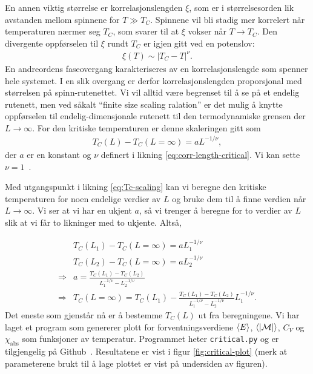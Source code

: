 \documentclass[11pt]{article}
\newcommand{\abs}[1]{|#1|}
\begin{document}
En annen viktig størrelse er korrelasjonslengden $\xi$, som er i
størrelsesorden lik avstanden mellom spinnene for $T\gg T_C$. Spinnene
vil bli stadig mer korrelert når temperaturen nærmer seg $T_C$, som
svarer til at $\xi$ vokser når $T\rightarrow T_C$. Den divergente
oppførselen til $\xi$ rundt $T_C$ er igjen gitt ved en potenslov:
\begin{align}
  \xi(T) \sim |T_C - T|^\nu.\label{eq:corr-length-critical}
\end{align}
En andreordens faseovergang karakteriseres av en korrelasjonslengde
som spenner hele systemet. I en slik overgang er derfor
korrelasjonslengden proporsjonal med størrelsen på
spinn-rutenettet. Vi vil alltid være begrenset til å se på et endelig
rutenett, men ved såkalt ``finite size scaling ralation'' er det mulig
å knytte oppførselen til endelig-dimensjonale rutenett til den
termodynamiske grensen der $L\rightarrow\infty$. For den kritiske
temperaturen er denne skaleringen gitt som 
\begin{align}
  T_C(L) - T_C(L=\infty) = aL^{-1/\nu}\label{eq:Tc-scaling},
\end{align} 
der $a$ er en konstant og $\nu$ definert i likning \eqref{eq:corr-length-critical}.  Vi kan sette
$\nu=1$~\cite{oppgavetekst-prosjekt-4}. 

\vspace{\baselineskip}

Med utgangspunkt i likning \eqref{eq:Tc-scaling} kan vi beregne den
kritiske temperaturen for noen endelige verdier av $L$ og bruke dem
til å finne verdien når $L\rightarrow\infty$. Vi ser at vi har en
ukjent $a$, så vi trenger å beregne for to verdier av $L$ slik at vi
får to likninger med to ukjente. Altså,

\begin{align}
  &T_C(L_1) - T_C(L=\infty) = aL_1^{-1/\nu}\\
  &T_C(L_2) - T_C(L=\infty) = aL_2^{-1/\nu}\\
\Rightarrow &a = \frac{ T_C(L_1) - T_C(L_2)} {L_1^{-1/\nu} -
  L_2^{-1/\nu}}\\
\Rightarrow &T_C(L=\infty) = T_C(L_1) - \frac{ T_C(L_1) - T_C(L_2)} {L_1^{-1/\nu} -
  L_2^{-1/\nu}}L_1^{-1/\nu}\label{eq:Tc-inf-scale-expression}.
\end{align}
Det eneste som gjenstår nå er å bestemme $T_C(L)$ ut fra
beregningene. Vi har laget et program som genererer plott for
forventningsverdiene $\langle E \rangle$, $\mean{\abs{\mathcal{M}}}$, $C_V$ og
$\chi_\text{abs}$ som funksjoner av temperatur. Programmet heter
\texttt{critical.py} og er tilgjengelig på
Github~\cite{github-repo}. Resultatene er vist i figur \ref{fig:critical-plot} (merk at
parameterene brukt til å lage plottet er vist på undersiden av
figuren). 
\end{document}
